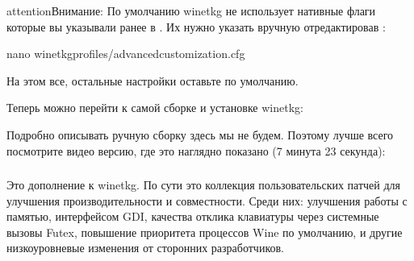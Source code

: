 \documentclass[letterpaper,10pt,russian,openany]{sphinxmanual}
\begin{document}
\begin{sphinxadmonition}{attention}{Внимание:}
\sphinxAtStartPar
По умолчанию wine\sphinxhyphen{}tkg не использует нативные флаги которые вы указывали ранее в .
Их нужно указать вручную отредактировав :

\begin{sphinxVerbatim}[commandchars=\\\{\}]
nano wine\PYGZhy{}tkg\PYGZhy{}profiles/advanced\PYGZhy{}customization.cfg 


\end{sphinxVerbatim}
\end{sphinxadmonition}

\sphinxAtStartPar
На этом все, остальные настройки оставьте по умолчанию.

\sphinxAtStartPar
Теперь можно перейти к самой сборке и установке wine\sphinxhyphen{}tkg: 

\sphinxAtStartPar
{}

\sphinxAtStartPar
Подробно описывать ручную сборку здесь мы не будем.
Поэтому лучше всего посмотрите видео версию, где это наглядно показано (7 минута 23 секунда):

\sphinxAtStartPar
{}

\ignorespaces 

\subsubsection{}
\label{\detokenize{source/linux-gaming:wine-tkg-userpatches}}\label{\detokenize{source/linux-gaming:index-6}}\label{\detokenize{source/linux-gaming:id6}}
\sphinxAtStartPar
Это  дополнение к wine\sphinxhyphen{}tkg.
По сути это коллекция пользовательских патчей для улучшения производительности и совместности.
Среди них: улучшения работы с памятью, интерфейсом GDI, качества отклика клавиатуры через системные вызовы Futex,
повышение приоритета процессов Wine по умолчанию, и другие низкоуровневые изменения от сторонних разработчиков.
\end{document}
